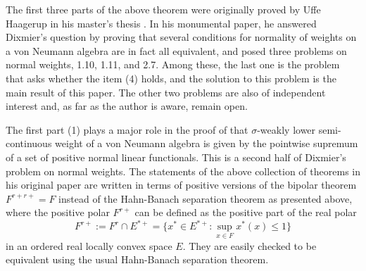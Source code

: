 \documentclass[noamsfonts,a4paper,10pt]{amsart}
\theoremstyle{plain}
\theoremstyle{definition}
\begin{document}
The first three parts of the above theorem were originally proved by Uffe Haagerup in his master's thesis \cite{MR380438}.
In his monumental paper, he answered Dixmier's question \cite{MR59485} by proving that several conditions for normality of weights on a von Neumann algebra are in fact all equivalent, and posed three problems on normal weights, 1.10, 1.11, and 2.7.
Among these, the last one is the problem that asks whether the item (4) holds, and the solution to this problem is the main result of this paper.
The other two problems are also of independent interest and, as far as the author is aware, remain open.

The first part (1) plays a major role in the proof of that $\sigma$-weakly lower semi-continuous weight of a von Neumann algebra is given by the pointwise supremum of a set of positive normal linear functionals.
This is a second half of Dixmier's problem on normal weights.
The statements of the above collection of theorems in his original paper are written in terms of positive versions of the bipolar theorem $F^{r+r+}=F$ instead of the Hahn-Banach separation theorem as presented above, where the positive polar $F^{r+}$ can be defined as the positive part of the real polar 
\[F^{r+}:=F^r\cap E^{*+}=\{x^*\in E^{*+}:\sup_{x\in F}x^*(x)\le1\}\]
in an ordered real locally convex space $E$.
They are easily checked to be equivalent using the usual Hahn-Banach separation theorem.
\end{document}
